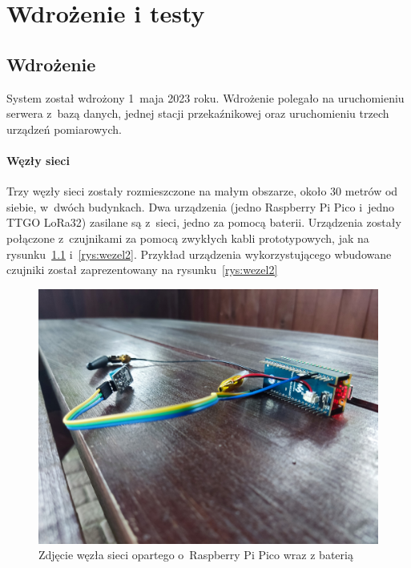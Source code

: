 \chapter{Wdrożenie i testy}

\section{Wdrożenie}
System został wdrożony 1~maja 2023 roku.
Wdrożenie polegało na uruchomieniu serwera z~bazą danych, jednej stacji przekaźnikowej oraz uruchomieniu trzech urządzeń pomiarowych.

\subsubsection{Węzły sieci}

Trzy węzły sieci zostały rozmieszczone na małym obszarze, około 30 metrów od siebie, w~dwóch budynkach.
Dwa urządzenia (jedno Raspberry Pi Pico i~jedno TTGO LoRa32) zasilane są z~sieci, jedno za pomocą baterii.
Urządzenia zostały połączone z~czujnikami za pomocą zwykłych kabli prototypowych, jak na rysunku~\ref{rys:wezel1} i~\ref{rys:wezel2}.
Przykład urządzenia wykorzystującego wbudowane czujniki został zaprezentowany na rysunku~\ref{rys:wezel2}

\begin{figure}[b!]
    \begin{center}
        \includegraphics[width=13cm]{pic/wezel1.jpg}
    \end{center}
    \caption{Zdjęcie węzła sieci opartego o~Raspberry Pi Pico wraz z baterią}\label{rys:wezel1}
\end{figure}

